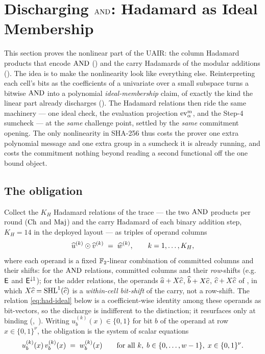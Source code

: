 \section{Discharging $\operatorname{AND}$: Hadamard as Ideal Membership}
\label{sec:hadamard}

This section proves the nonlinear part of the UAIR: the column Hadamard
products that encode $\operatorname{AND}$ () and the carry Hadamards of the
modular additions (). The idea is to make the nonlinearity look
like everything else. Reinterpreting each cell's bits as the coefficients of a
univariate over a small subspace turns a bitwise $\operatorname{AND}$ into a polynomial
\emph{ideal-membership} claim, of exactly the kind the linear part already
discharges (). The Hadamard relations then ride the same
machinery --- one ideal check, the evaluation projection $\operatorname{ev}^{\mathrm{m}}_{\alpha}$, and the
Step-4 sumcheck --- at the \emph{same} challenge point, settled by the
\emph{same} commitment opening. The only nonlinearity in SHA-256 thus costs the
prover one extra polynomial message and one extra group in a sumcheck it is
already running, and costs the commitment nothing beyond reading a second
functional off the one bound object.

\subsection{The obligation}
\label{sec:had-oblig}

Collect the $K_H$ Hadamard relations of the trace --- the two $\operatorname{AND}$
products per round ($\operatorname{Ch}$ and $\operatorname{Maj}$) and the carry Hadamard of each binary
addition step, $K_H = 14$ in the deployed layout --- as triples of operand
columns
\[
  \widehat{u}^{(k)}\odot\widehat{v}^{(k)} \;=\; \widehat{w}^{(k)},
  \qquad k = 1,\dots,K_H,
\]
where each operand is a fixed $\mathbb{F}_2$-linear combination of committed
columns and their shifts: for the $\operatorname{AND}$ relations, committed columns and
their \emph{row}-shifts (e.g.\ $\mathsf{E}$ and $\mathsf{E}^{\downarrow1}$); for
the adder relations, the operands $\widehat{a}+X\widehat{c}$, $\widehat{b}+X\widehat{c}$,
$\widehat{c}+X\widehat{c}$ of , in which $X\widehat{c}=\operatorname{SHL}^{1}(\widehat{c})$ is a
\emph{within-cell bit-shift} of the carry, not a row-shift. The relation \eqref{eq:had-ideal} below is a
coefficient-wise identity among these operands as bit-vectors, so the
discharge is indifferent to the distinction; it resurfaces only at binding
(,~). Writing
$u^{(k)}_b(x)\in\{0,1\}$ for bit $b$ of the operand at row
$x\in\{0,1\}^{\nu}$, the obligation is the system of scalar equations
\begin{equation}
  \label{eq:had-system}
  u^{(k)}_b(x)\,v^{(k)}_b(x) \;=\; w^{(k)}_b(x)
  \qquad \text{for all } k,\; b\in\{0,\dots,w-1\},\; x\in\{0,1\}^{\nu}.
\end{equation}


